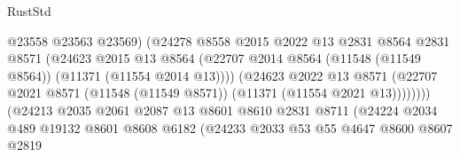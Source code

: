 \begin{lexlean}{RustStd}
\begin{coremodule}
                                          @23558
                                          @23563
                                          @23569)
                                        (@24278
                                          @8558
                                          @2015
                                          @2022
                                          @13
                                          @2831
                                          @8564
                                          @2831
                                          @8571
                                          (@24623
                                            @2015
                                            @13
                                            @8564
                                            (@22707
                                              @2014
                                              @8564
                                              (@11548 (@11549 @8564))
                                              (@11371 (@11554 @2014 @13))))
                                          (@24623
                                            @2022
                                            @13
                                            @8571
                                            (@22707
                                              @2021
                                              @8571
                                              (@11548 (@11549 @8571))
                                              (@11371 (@11554 @2021 @13))))))))
                                  (@24213
                                    @2035
                                    @2061
                                    @2087
                                    @13
                                    @8601
                                    @8610
                                    @2831
                                    @8711
                                    (@24224
                                      @2034
                                      @489
                                      @19132
                                      @8601
                                      @8608
                                      @6182
                                      (@24233
                                        @2033
                                        @53
                                        @55
                                        @4647
                                        @8600
                                        @8607
                                        @2819

\end{coremodule}
\end{lexlean}
